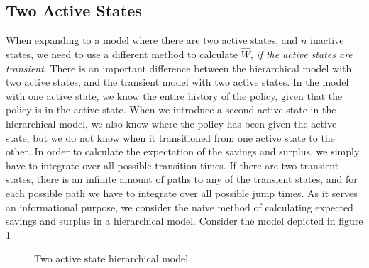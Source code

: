 \documentclass[12pt]{article}
\theoremstyle{my_thm}
\begin{document}
\subsection{Two Active States}
When expanding to a model where there are two active states, and $n$ inactive states, we need to use a different method to calculate $\hat{W}$, \textit{if the active states are transient}. There is an important difference between the hierarchical model with two active states, and the transient model with two active states. In the model with one active state, we know the entire history of the policy, given that the policy is in the active state. When we introduce a second active state in the hierarchical model, we also know where the policy has been given the active state, but we do not know when it transitioned from one active state to the other. In order to calculate the expectation of the savings and surplus, we simply have to integrate over all possible transition times. If there are two transient states, there is an infinite amount of paths to any of the transient states, and for each possible path we have to integrate over all possible jump times. As it serves an informational purpose, we consider the naive method of calculating expected savings and surplus in a hierarchical model. Consider the model depicted in figure \ref{fig:2}
 \def\PlA{(0,0)}
\begin{figure}[H]
\begin{center}
\caption{Two active state hierarchical model}
\label{fig:2}
\end{center}
\end{figure}
\end{document}
